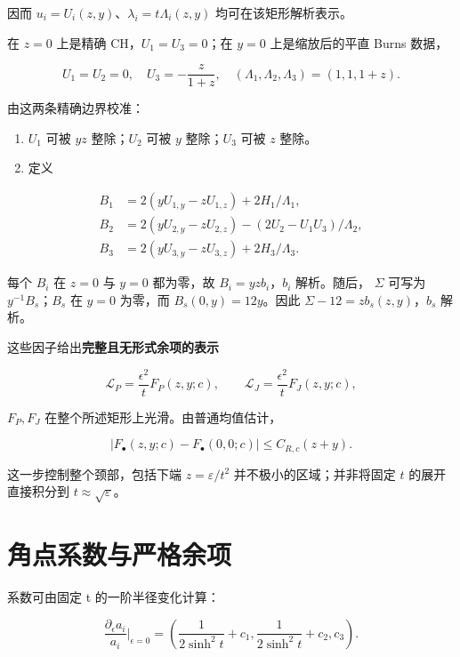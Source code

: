 \documentclass[UTF8,11pt,openany,oneside,fontset=none]{ctexbook}
\providecommand{\tightlist}{\setlength{\itemsep}{1pt}\setlength{\parskip}{0pt}}
\begin{document}
因而 \(u_i=U_i(z,y)\)、\(\lambda_i=t\Lambda_i(z,y)\) 均可在该矩形解析表示。

在 \(z=0\) 上是精确 CH，\(U_1=U_3=0\)；在 \(y=0\) 上是缩放后的平直 Burns 数据，

\[
 U_1=U_2=0,\quad U_3=-\frac z{1+z},\quad
 (\Lambda_1,\Lambda_2,\Lambda_3)=(1,1,1+z).
\]

由这两条精确边界校准：

\begin{enumerate}
\def\labelenumi{\arabic{enumi}.}
\tightlist
\item
  \(U_1\) 可被 \(yz\) 整除；\(U_2\) 可被 \(y\) 整除；\(U_3\) 可被 \(z\) 整除。
\item
  定义
\end{enumerate}

\[
\begin{aligned}
B_1&=2(yU_{1,y}-zU_{1,z})+2H_1/\Lambda_1,\\
B_2&=2(yU_{2,y}-zU_{2,z})-(2U_2-U_1U_3)/\Lambda_2,\\
B_3&=2(yU_{3,y}-zU_{3,z})+2H_3/\Lambda_3.
\end{aligned}
\]

每个 \(B_i\) 在 \(z=0\) 与 \(y=0\) 都为零，故 \(B_i=yzb_i\)，\(b_i\) 解析。随后， \(\Sigma\) 可写为 \(y^{-1}B_s\)；\(B_s\) 在 \(y=0\) 为零，而 \(B_s(0,y)=12y\)。因此 \(\Sigma-12=zb_s(z,y)\)，\(b_s\) 解析。

这些因子给出\textbf{完整且无形式余项的表示}

\[
\boxed{\mathscr L_P=\frac{\epsilon^2}{t}F_P(z,y;c),\qquad
\mathscr L_J=\frac{\epsilon^2}{t}F_J(z,y;c),}
\tag{9.6}\label{eq:r9:6}
\]

\(F_P,F_J\) 在整个所述矩形上光滑。由普通均值估计，

\[
 |F_\bullet(z,y;c)-F_\bullet(0,0;c)|\le C_{R,c}(z+y).
\tag{9.7}\label{eq:r9:7}
\]

这一步控制整个颈部，包括下端 \(z=\varepsilon/t^2\) 并不极小的区域；并非将固定 \(t\) 的展开直接积分到 \(t\approx\sqrt\varepsilon\)。

\section{角点系数与严格余项}\label{ch9:ux89d2ux70b9ux7cfbux6570ux4e0eux4e25ux683cux4f59ux9879}

系数可由固定 t 的一阶半径变化计算：

\[
\frac{\partial_\epsilon a_i}{a_i}\Big|_{\epsilon=0}
=\left(\frac1{2\sinh^2t}+c_1,
\frac1{2\sinh^2t}+c_2,c_3\right).
\]
\end{document}
